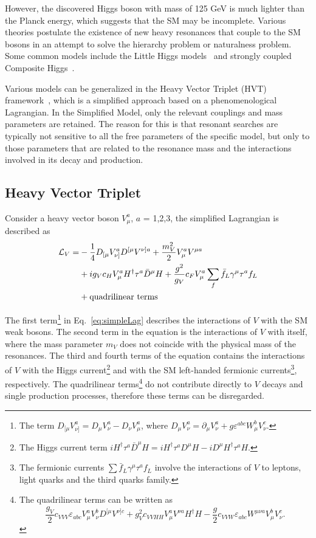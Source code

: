 However, the discovered Higgs boson with mass of 125 GeV is much lighter than the Planck energy, which suggests that the SM may be incomplete. Various theories postulate the existence of new heavy resonances that couple to the SM bosons in an attempt to solve the hierarchy problem or naturalness problem. Some common models include the Little Higgs models~\cite{Han:2003wu,Perelstein:2005ka} and strongly coupled Composite Higgs~\cite{Contino:2011np,Marzocca:2012zn}. 

Various models can be generalized in the Heavy Vector Triplet (HVT) framework~\cite{Pappadopulo:2014qza}, which is a simplified approach based on a phenomenological Lagrangian. In the Simplified Model, only the relevant couplings and mass parameters are retained. The reason for this is that resonant searches are typically not sensitive to all the free parameters of the specific model, but only to those parameters that are related to the resonance mass and the interactions involved in its decay and production.

\subsection{Heavy Vector Triplet} \label{sec:hvtmodel}

Consider a heavy vector boson $V_\mu^a$, $a$ = 1,2,3, the simplified Lagrangian is described as
\begin{equation} \label{eq:simpleLag}
  \begin{aligned}
    \mathcal{L}_V = &-\frac{1}{4}D_{[\mu}V_{\nu]}^aD^{[\mu}V^{\nu]a}+\frac{m_V^2}{2}V_\mu^aV^{\mu a}\\
    &+ig_Vc_HV_\mu^aH^\dagger\tau^a\bar{D}^\mu H+\frac{g^2}{g_V}c_FV_\mu^a\sum\limits_{f}\bar{f}_L\gamma^\mu\tau^af_L\\
    &+\textup{quadrilinear terms}
  \end{aligned}
\end{equation}

The first term\footnote{The term \(D_{[\mu}V_{\nu]}^a = D_\mu V_\nu^a - D_\nu V_\mu^a\), where \(D_\mu V_\nu^a = \partial_\mu V_\nu^a + g\varepsilon^{abc}W_\mu^bV_\nu^c\).} in Eq.~\ref{eq:simpleLag} describes the interactions of $V$ with the SM weak bosons. The second term in the equation is the interactions of $V$ with itself, where the mass parameter $m_V$ does not coincide with the physical mass of the resonances. The third and fourth terms of the equation contains the interactions of $V$ with the Higgs current\footnote{The Higgs current term \(iH^\dagger\tau^a\bar{D}^\mu H = iH^\dagger\tau^aD^\mu H - iD^\mu H^\dagger\tau^aH\).} and with the SM left-handed fermionic currents\footnote{The fermionic currents \(\sum\bar{f}_L\gamma^\mu\tau^af_L\) involve the interactions of $V$ to leptons, light quarks and the third quarks family.}, respectively. The quadrilinear terms\footnote{The quadrilinear terms can be written as \[\frac{g_V}{2}c_{VVV}\varepsilon_{abc}V_\mu^aV_\nu^bD^{[\mu}V^{\nu]c} + g_V^2c_{VVHH}V_\mu^aV^{\nu a}H^\dagger H - \frac{g}{2}c_{VVW}\varepsilon_{abc}W^{\mu\nu a}V_\mu^bV_\nu^c.\]} do not contribute directly to $V$ decays and single production processes, therefore these terms can be disregarded.

